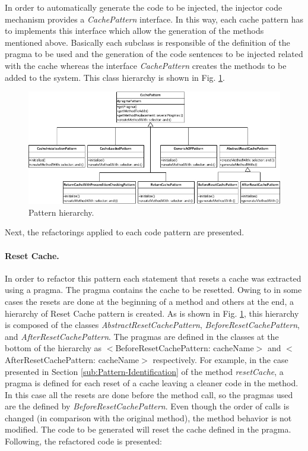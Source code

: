 \documentclass[preprint,10pt]{sigplanconf}
\begin{document}
In order to automatically generate the code to be injected, the injector
code mechanism provides a \emph{CachePattern} interface. In this way,
each cache pattern has to implements this interface which allow the
generation of the methods mentioned above. Basically each subclass
is responsible of the definition of the pragma to be used and the
generation of the code sentences to be injected related with the cache
whereas the interface \emph{CachePattern} creates the methods to be
added to the system. This class hierarchy is shown in Fig. \ref{fig:Pattern-hierarchy.}.
%
\begin{figure}
\begin{centering}
\includegraphics[bb=21bp 541bp 561bp 789bp,scale=0.7]{PatternInheritance}
\par\end{centering}

\caption{Pattern hierarchy.\label{fig:Pattern-hierarchy.}}

\end{figure}


Next, the refactorings applied to each code pattern are presented.

\paragraph{Reset Cache.} In order to refactor this pattern each statement
that resets a cache was extracted using a pragma. The pragma contains
the cache to be resetted. Owing to in some cases the resets are done
at the beginning of a method and others at the end, a hierarchy of
Reset Cache pattern is created. As is shown in Fig. \ref{fig:Pattern-hierarchy.},
this hierarchy is composed of the classes \emph{AbstractResetCachePattern},
\emph{BeforeResetCachePattern}, and \emph{AfterResetCachePattern}.
The pragmas are defined in the classes at the bottom of the hierarchy
as $<$BeforeResetCachePattern: cacheName$>$ and $<$AfterResetCachePattern:
cacheName$>$ respectively. For example, in the case presented in Section
\ref{sub:Pattern-Identification} of the method \emph{resetCache},
a pragma is defined for each reset of a cache leaving a cleaner code
in the method. In this case all the resets are done before the method
call, so the pragmas used are the defined by \emph{BeforeResetCachePattern}.
Even though the order of calls is changed (in comparison with the
original method), the method behavior is not modified. The code to
be generated will reset the cache defined
in the pragma. Following, the refactored code is presented:
\end{document}
